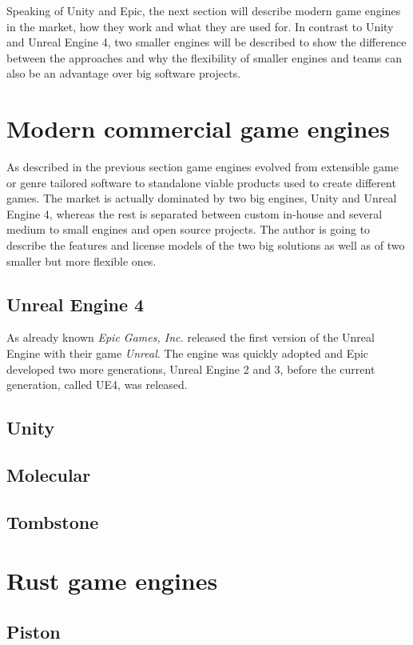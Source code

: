 Speaking of Unity and Epic, the next section will describe modern game engines in the market, how they work and what they are used for. In contrast to Unity and Unreal Engine 4, two smaller engines will be described to show the difference between the approaches and why the flexibility of smaller engines and teams can also be an advantage over big software projects.


\section{Modern commercial game engines}

As described in the previous section game engines evolved from extensible game or genre tailored software to standalone viable products used to create different games. The market is actually dominated by two big engines, Unity and Unreal Engine 4, whereas the rest is separated between custom in-house and several medium to small engines and open source projects. The author is going to describe the features and license models of the two big solutions as well as of two smaller but more flexible ones.

\subsection{Unreal Engine 4}

As already known \textit{Epic Games, Inc.} released the first version of the Unreal Engine with their game \textit{Unreal}. The engine was quickly adopted and Epic developed two more generations, Unreal Engine 2 and 3, before the current generation, called \ac{UE4}, was released. 

\subsection{Unity}
\blindtext
\subsection{Molecular}
\blindtext
\subsection{Tombstone}
\blindtext
\section{Rust game engines}
\blindtext
\subsection{Piston}
\blindtext
